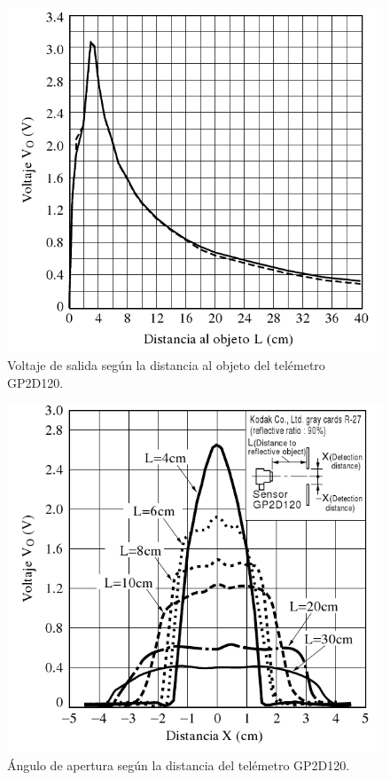 	\begin{figure}[ht]
		\centering
		\includegraphics[scale=0.35]{tel-VxL.png}
		\caption{Voltaje de salida seg\'un la distancia al objeto del tel\'emetro GP2D120.}
		\label{HFteldistancia}
	\end{figure}
	
	
	\begin{figure}[ht]
		\centering
		\includegraphics[scale=0.35]{tel-VxX.png}
		\caption{\'Angulo de apertura seg\'un la distancia del tel\'emetro GP2D120.}
		\label{HFtelapertura}
	\end{figure}

